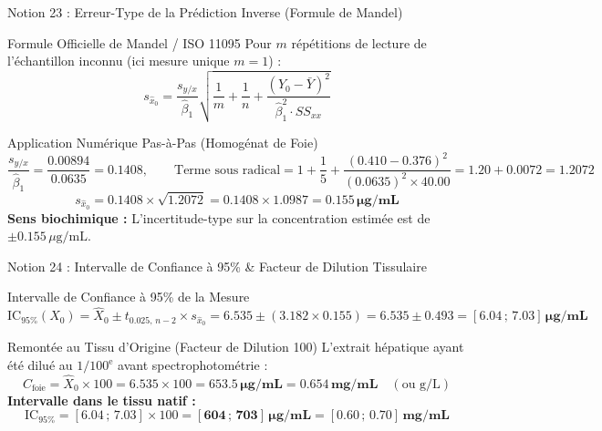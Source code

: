 \documentclass[aspectratio=169,10pt]{beamer}
\begin{document}
\begin{frame}{Notion 23 : Erreur-Type de la Prédiction Inverse (Formule de Mandel)}
  \begin{conceptbox}{Formule Officielle de Mandel / ISO 11095}
    \footnotesize
    Pour $m$ répétitions de lecture de l'échantillon inconnu (ici mesure unique $m = 1$) :
    \begin{equation*}
      s_{\hat{x}_0} = \frac{s_{y/x}}{\hat{\beta}_1} \sqrt{\frac{1}{m} + \frac{1}{n} + \frac{(Y_0 - \bar{Y})^2}{\hat{\beta}_1^2 \cdot SS_{xx}}}
    \end{equation*}
  \end{conceptbox}
  \vspace{1mm}
  \begin{biobox}{Application Numérique Pas-à-Pas (Homogénat de Foie)}
    \footnotesize
    \begin{equation*}
      \frac{s_{y/x}}{\hat{\beta}_1} = \frac{0.00894}{0.0635} = 0.1408, \qquad \text{Terme sous radical} = 1 + \frac{1}{5} + \frac{(0.410 - 0.376)^2}{(0.0635)^2 \times 40.00} = 1.20 + 0.0072 = 1.2072
    \end{equation*}
    \begin{equation*}
      s_{\hat{x}_0} = 0.1408 \times \sqrt{1.2072} = 0.1408 \times 1.0987 = \mathbf{0.155\,\mu\text{g/mL}}
    \end{equation*}
    \textbf{Sens biochimique :} L'incertitude-type sur la concentration estimée est de $\pm 0.155\,\mu\text{g/mL}$.
  \end{biobox}
\end{frame}

\begin{frame}{Notion 24 : Intervalle de Confiance à 95\% \& Facteur de Dilution Tissulaire}
  \begin{conceptbox}{Intervalle de Confiance à 95\% de la Mesure}
    \footnotesize
    \begin{equation*}
      \text{IC}_{95\%}(X_0) = \hat{X}_0 \pm t_{0.025, \, n-2} \times s_{\hat{x}_0} = 6.535 \pm (3.182 \times 0.155) = 6.535 \pm 0.493 = \mathbf{[6.04 \,;\, 7.03]\,\mu\text{g/mL}}
    \end{equation*}
  \end{conceptbox}
  \vspace{1mm}
  \begin{biobox}{Remontée au Tissu d'Origine (Facteur de Dilution 100)}
    \footnotesize
    L'extrait hépatique ayant été dilué au $1/100^{\text{e}}$ avant spectrophotométrie :
    \begin{equation*}
      C_{\text{foie}} = \hat{X}_0 \times 100 = 6.535 \times 100 = \mathbf{653.5\,\mu\text{g/mL}} = \mathbf{0.654\,\text{mg/mL}} \quad (\text{ou g/L})
    \end{equation*}
    \textbf{Intervalle dans le tissu natif :}
    \begin{equation*}
      \text{IC}_{95\%} = [6.04 \,;\, 7.03] \times 100 = \mathbf{[604 \,;\, 703]\,\mu\text{g/mL}} = \mathbf{[0.60 \,;\, 0.70]\,\text{mg/mL}}
    \end{equation*}
  \end{biobox}
\end{frame}
\end{document}
